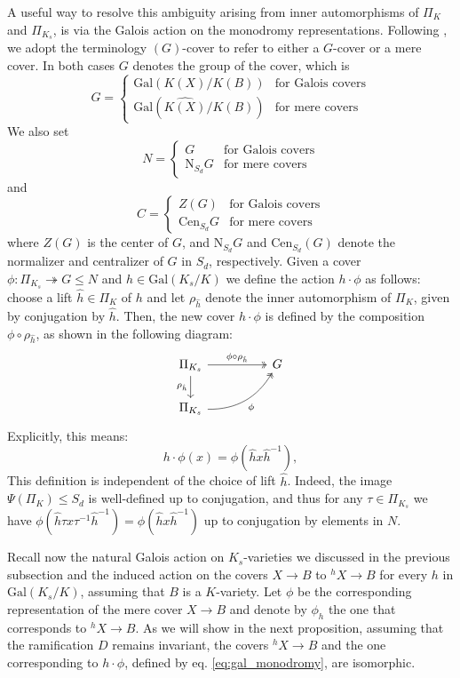 \documentclass[10pt]{amsart}
\theoremstyle{definition}
\newcommand{\Gal}{{ \mathrm{Gal}}}
\begin{document}
A useful way to resolve this ambiguity arising from inner automorphisms of $\Pi_K$ and $\Pi_{K_s}$, is via the Galois action on the monodromy representations. Following \cite{DebesDouai97}, we adopt the terminology $(G)$-cover to refer to either a $G$-cover or a mere cover. In both cases $G$ denotes the group of the cover, which is
\[
 G =
  \begin{cases}
  \Gal(K(X)/K(B)) & \text{for Galois covers} 
  \\
  \Gal(\widehat{K(X)}/K(B)) & \text{for mere covers}
  \end{cases}
\]
We also set
\[
  N=
  \begin{cases}
  G & \text{for Galois covers} 
  \\
  \mathrm{N}_{S_d}G & \text{for mere covers}
  \end{cases}
\]
and
\[
  C=
  \begin{cases}
  Z(G) & \text{for Galois covers} 
  \\
  \mathrm{Cen}_{S_d}G & \text{for mere covers}
  \end{cases}
\]
where $Z(G)$ is the center of $G$, and $\mathrm{N}_{S_d}G$ and $\mathrm{Cen}_{S_d}(G)$ denote the normalizer and centralizer of $G$ in $S_d$, respectively. Given a cover $\phi\colon \Pi_{K_s} \twoheadrightarrow G \leq N$ and $h \in \Gal(K_s/K)$ we define the action $h\cdot \phi$ as follows: 
choose a lift $\hat{h} \in \Pi_K$ of $h$ and let $\rho_{\hat{h}}$ denote the inner automorphism of $\Pi_K$, given by conjugation by $\hat{h}$. Then, the new cover $h\cdot \phi$ is defined by the composition $\phi \circ \rho_{\hat{h}}$, as shown in the following diagram:
\[
\begin{tikzcd}
\Pi_{K_s} \arrow[d, "\rho_{\hat{h}}"'] \arrow[rr, two heads, "\phi \circ \rho_{\hat{h}}"] & & G \\
\Pi_{K_s} \arrow[rru, two heads, bend right, "\phi"'] &
\end{tikzcd}
\]
Explicitly, this means:
\begin{equation}\label{eq:gal_monodromy}
h \cdot \phi(x) = \phi( \hat{h} x \hat{h}^{-1}),
\end{equation}
This definition is independent of the choice of lift $\hat{h}$. Indeed, the image $\Psi(\Pi_K) \leq S_d$ is well-defined up to conjugation, and thus for any $\tau \in \Pi_{K_s}$ we have $\phi(\hat h \tau x \tau^{-1} \hat{h}^{-1}) = \phi( \hat{h} x \hat{h}^{-1}) $ up to conjugation by elements in $N$.

Recall now the natural Galois action on $K_s$-varieties we discussed in the previous subsection and the induced action on the covers 
$X \to B$ to $^h \! X \to B$ for every $h$ in $\Gal(K_s/K)$, assuming that $B$ is a $K$-variety. Let $\phi$ be the corresponding representation of the mere cover $X\rightarrow B$ and denote by $\phi_h$ the one that corresponds to $^h \! X \to B$. 
As we will show in the next proposition, assuming that the ramification $D$ remains invariant, the covers $^h \! X\to B$ and the one corresponding to $h\cdot \phi$, defined by eq. \eqref{eq:gal_monodromy}, are isomorphic. 
\end{document}
